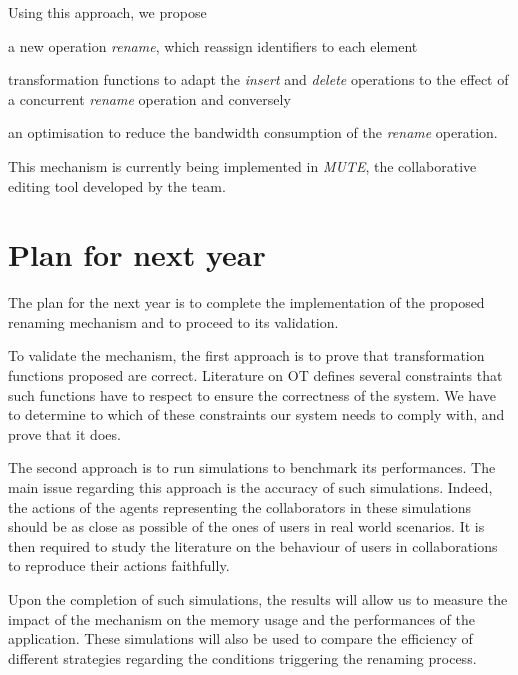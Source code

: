 \documentclass[11pt]{article}
\begin{document}
Using this approach, we propose
\begin{enumerate*}
    \item a new operation \emph{rename}, which reassign identifiers to each element
    \item transformation functions to adapt the \emph{insert} and \emph{delete} operations to the effect of a concurrent \emph{rename} operation and conversely
    \item an optimisation to reduce the bandwidth consumption of the \emph{rename} operation.
\end{enumerate*}

This mechanism is currently being implemented in \emph{MUTE}, the collaborative editing tool developed by the team.

\section*{Plan for next year}

\hspace{1em} The plan for the next year is to complete the implementation of the proposed renaming mechanism
and to proceed to its validation.


To validate the mechanism, the first approach is to prove that transformation functions proposed are correct.
Literature on \ac{OT} defines several constraints that such functions have to respect
to ensure the correctness of the system.
We have to determine to which of these constraints our system needs to comply with, and prove that it does.


The second approach is to run simulations to benchmark its performances.
The main issue regarding this approach is the accuracy of such simulations.
Indeed, the actions of the agents representing the collaborators in these simulations should be as close as possible of the ones of users in real world scenarios.
It is then required to study the literature on the behaviour of users in collaborations to reproduce their actions faithfully.

Upon the completion of such simulations, the results will allow us to measure the impact of the mechanism on the memory usage and the performances of the application.
These simulations will also be used to compare the efficiency of different strategies
regarding the conditions triggering the renaming process.
\end{document}
